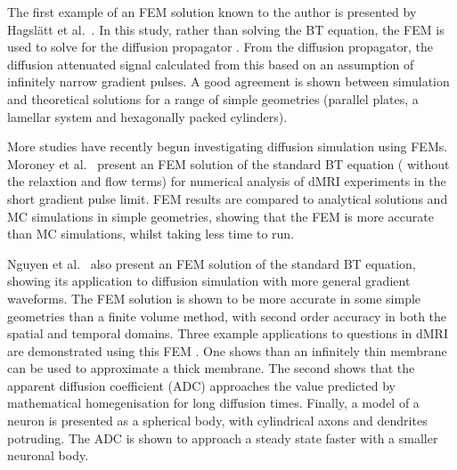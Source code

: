 The first example of an FEM solution known to the author is presented by Hagsl\"att et al.\ \cite{Hagslatt2003}.
In this study, rather than solving the BT equation, the FEM is used to solve for the diffusion propagator \cite{Callaghan1991,Price1997}. From the diffusion propagator, the diffusion attenuated signal calculated from this based on an assumption of infinitely narrow gradient pulses.
A good agreement is shown between simulation and theoretical solutions for a range of simple geometries (parallel plates, a lamellar system and  hexagonally packed cylinders).

More studies have recently begun investigating diffusion simulation using FEMs.
Moroney et al.\ \cite{Moroney2013} present an FEM solution of the standard BT equation ( without the relaxtion and flow terms) for numerical analysis of dMRI experiments in the short gradient pulse limit. FEM results are compared to analytical solutions and MC simulations in simple geometries, showing that the FEM is more accurate than MC simulations, whilst taking less time to run.

Nguyen et al.\ \cite{Nguyen2014} also present an FEM solution of the standard BT equation, showing its application to diffusion simulation with more general gradient waveforms.
The FEM solution is shown to be more accurate in some simple geometries than a finite volume method, with second order accuracy in both the spatial and temporal domains.
Three example applications to questions in dMRI are demonstrated using this FEM
\cite{Nguyen2014}.
One shows than an infinitely thin membrane can be used to approximate a thick membrane. The second shows that the apparent diffusion coefficient (ADC) approaches the value predicted by mathematical homegenisation for long diffusion times. Finally, a model of a neuron is presented as a spherical body, with cylindrical axons and dendrites potruding. The ADC is shown to approach a steady state faster with a smaller neuronal body.

